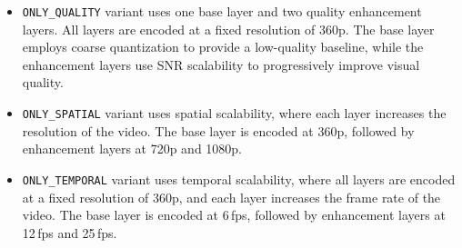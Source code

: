         \begin{itemize}
            \item {
                \texttt{ONLY\_QUALITY} variant uses one base layer and two quality
                enhancement layers. All layers are encoded at a fixed resolution of
                360p. The base layer employs coarse quantization to provide a
                low-quality baseline, while the enhancement layers use SNR
                scalability to progressively improve visual quality.
            } 
            \item {
                \texttt{ONLY\_SPATIAL} variant uses spatial scalability, where each
                layer increases the resolution of the video. The base layer is
                encoded at 360p, followed by enhancement layers at 720p and 1080p.
            }

            \item {
                \texttt{ONLY\_TEMPORAL} variant uses temporal scalability, where all
                layers are encoded at a fixed resolution of 360p, and each layer
                increases the frame rate of the video. The base layer is encoded at
                6\,fps, followed by enhancement layers at 12\,fps and 25\,fps.
            } 
        \end{itemize}



